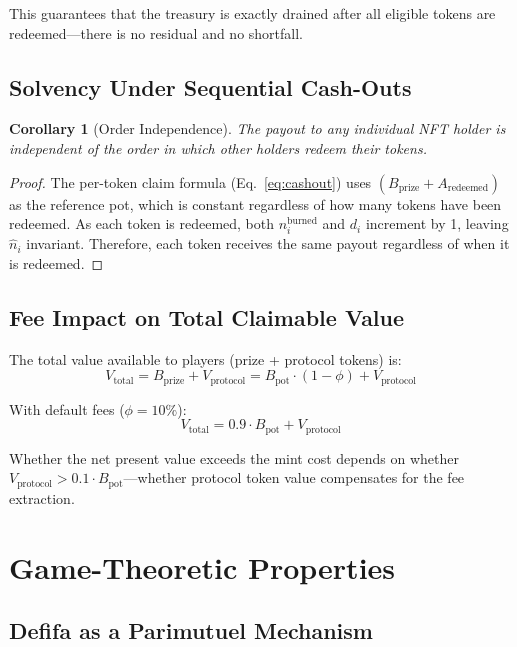 \documentclass[11pt,a4paper]{article}
\newtheorem{corollary}[theorem]{Corollary}
\begin{document}
This guarantees that the treasury is exactly drained after all eligible tokens are redeemed---there is no residual and no shortfall.

\subsection{Solvency Under Sequential Cash-Outs}

\begin{corollary}[Order Independence]
The payout to any individual NFT holder is independent of the order in which other holders redeem their tokens.
\end{corollary}

\begin{proof}
The per-token claim formula (Eq.~\ref{eq:cashout}) uses $(B_{\text{prize}} + A_{\text{redeemed}})$ as the reference pot, which is constant regardless of how many tokens have been redeemed. As each token is redeemed, both $n_i^{\text{burned}}$ and $d_i$ increment by 1, leaving $\hat{n}_i$ invariant. Therefore, each token receives the same payout regardless of when it is redeemed.
\end{proof}

\subsection{Fee Impact on Total Claimable Value}

The total value available to players (prize + protocol tokens) is:
\begin{equation}
V_{\text{total}} = B_{\text{prize}} + V_{\text{protocol}} = B_{\text{pot}} \cdot (1 - \phi) + V_{\text{protocol}}
\end{equation}

With default fees ($\phi = 10\%$):
$$V_{\text{total}} = 0.9 \cdot B_{\text{pot}} + V_{\text{protocol}}$$

Whether the net present value exceeds the mint cost depends on whether $V_{\text{protocol}} > 0.1 \cdot B_{\text{pot}}$---whether protocol token value compensates for the fee extraction.

\section{Game-Theoretic Properties}

\subsection{Defifa as a Parimutuel Mechanism}
\end{document}
